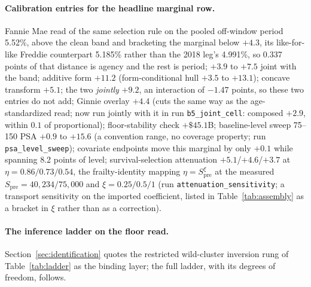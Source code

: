 \documentclass[12pt]{article}
\begin{document}
\paragraph{Calibration entries for the headline marginal row.} Fannie Mae read of the same selection rule on the pooled off-window period 5.52\%, above the clean band and bracketing the marginal below $+4.3$, its like-for-like Freddie counterpart 5.185\% rather than the 2018 leg's 4.991\%, so 0.337 points of that distance is agency and the rest is period; $+3.9$ to $+7.5$ joint with the band; additive form $+11.2$ (form-conditional hull $+3.5$ to $+13.1$); concave transform $+5.1$; the two \emph{jointly} $+9.2$, an interaction of $-1.47$ points, so these two entries do not add; Ginnie overlay $+4.4$ (cuts the same way as the age-standardized read; now run jointly with it in run \texttt{b5\_joint\_cell}: composed $+2.9$, within $0.1$ of proportional); floor-stability check $+\$45.1$B; baseline-level sweep 75--150 PSA $+0.9$ to $+15.6$ (a convention range, no coverage property; run \texttt{psa\_level\_sweep}); covariate endpoints move this marginal by only $+0.1$ while spanning 8.2 points of level; survival-selection attenuation $+5.1$/$+4.6$/$+3.7$ at $\eta = 0.86/0.73/0.54$, the frailty-identity mapping $\eta = S_{\mathrm{pre}}^{\xi}$ at the measured $S_{\mathrm{pre}} = 40{,}234/75{,}000$ and $\xi = 0.25/0.5/1$ (run \texttt{attenuation\_sensitivity}; a transport sensitivity on the imported coefficient, listed in Table~\ref{tab:assembly} as a bracket in $\xi$ rather than as a correction).

\paragraph{The inference ladder on the floor read.} Section~\ref{sec:identification} quotes the restricted wild-cluster inversion rung of Table~\ref{tab:ladder} as the binding layer; the full ladder, with its degrees of freedom, follows.
\end{document}
